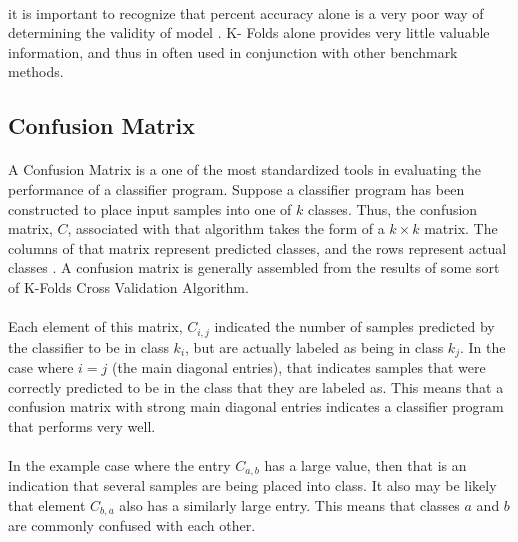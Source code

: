 \documentclass[12pt,letterpaper]{article}
\begin{document}
\paragraph*{}it is important to recognize that percent accuracy alone is a very poor way of determining the validity of model \cite{Geron}. K- Folds alone provides very little valuable information, and thus in often used in conjunction with other benchmark methods.


\subsection{Confusion Matrix}
\paragraph*{}A Confusion Matrix is a one of the most standardized tools in evaluating the performance of a classifier program. Suppose a classifier program has been constructed to place input samples into one of $k$ classes. Thus, the confusion matrix, $C$, associated with that algorithm takes the form of a $k \times k$ matrix. The columns of that matrix represent predicted classes, and the rows represent actual classes \cite{Geron}. A confusion matrix is generally assembled from the results of some sort of K-Folds Cross Validation Algorithm. 
\paragraph*{}Each element of this matrix, $C_{i,j}$ indicated the number of samples predicted by the classifier to be in class $k_i$, but are actually labeled as being in class $k_j$. In the case where $i = j$ (the main diagonal entries), that indicates samples that were correctly predicted to be in the class that they are labeled as. This means that a confusion matrix with strong main diagonal entries indicates a classifier program that performs very well. 
\paragraph*{}In the example case where the entry $C_{a,b}$ has a large value, then that is an indication that several samples are being placed into class. It also may be likely that element $C_{b,a}$ also has a similarly large entry. This means that classes $a$ and $b$ are commonly confused with each other. 
\end{document}
